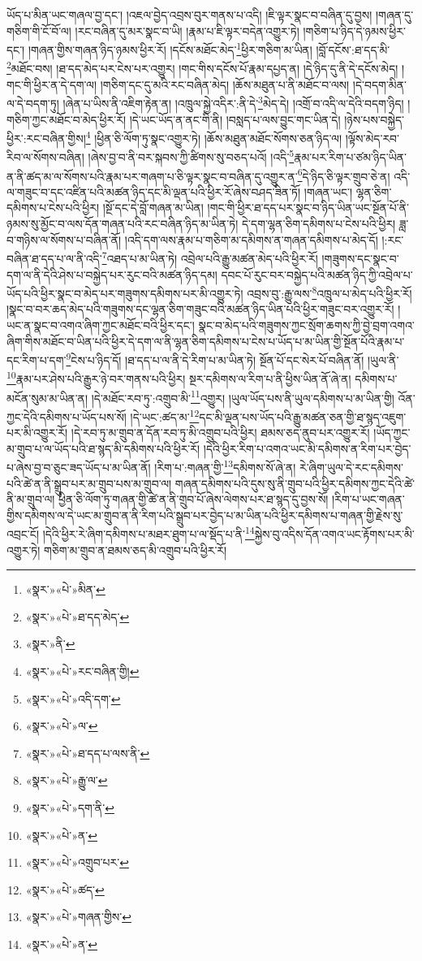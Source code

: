 ཡོད་པ་མིན་ཡང་གཞལ་བྱ་དང་། །འཇལ་བྱེད་འབྲས་བུར་གནས་པ་འདི། །ཇི་ལྟར་སྣང་བ་བཞིན་དུ་བྱས། །གཞན་དུ་གཅིག་གི་ངོ་བོ་ལ། །རང་བཞིན་དུ་མར་སྣང་བ་ཡི། །རྣམ་པ་ཇི་ལྟར་བདེན་འགྱུར་ཏེ། །གཅིག་པ་ཉིད་དེ་ཉམས་ཕྱིར་དང་། །གཞན་གྱིས་གཞན་ཉིད་ཉམས་ཕྱིར་རོ། །དངོས་མཐོང་མེད་\footnote{«སྣར་»«པེ་»མིན་}ཕྱིར་གཅིག་མ་ཡིན། །བློ་དངོས་:ཐ་དད་མི་\footnote{«སྣར་»«པེ་»ཐ་དད་མེད་}མཐོང་བས། །ཐ་དད་མེད་པར་ངེས་པར་འགྱུར། །གང་གིས་དངོས་པོ་རྣམ་དཔྱད་ན། །དེ་ཉིད་དུ་ནི་དེ་དངོས་མེད། །གང་གི་ཕྱིར་ན་དེ་དག་ལ། །གཅིག་དང་དུ་མའི་རང་བཞིན་མེད། །ཆོས་མཐུན་པ་ནི་མཐོང་བ་ལས། །དེ་བདག་མིན་ལ་དེ་བདག་ཏུ། །ཞེན་པ་ཡིས་ནི་འཇིག་རྟེན་ན། །འཁྲུལ་སྐྱེ་འདིར་:ནི་དེ་\footnote{«སྣར་»ནི་}མེད་དེ། །འགྲོ་བ་འདི་ལ་དེའི་བདག་ཉིད། །གཅིག་ཀྱང་མཐོང་བ་མེད་ཕྱིར་རོ། །དེ་ཡང་ཡོད་ན་ནང་གི་ནི། །བསླད་པ་ལས་བྱུང་གང་ཡིན་དེ། །ཉེས་པས་བསྐྱེད་ཕྱིར་:རང་བཞིན་གྱིས།\footnote{«སྣར་»«པེ་»རང་བཞིན་གྱི།} །ཕྱིན་ཅི་ལོག་ཏུ་སྣང་འགྱུར་ཏེ། །ཆོས་མཐུན་མཐོང་སོགས་ཅན་ཉིད་ལ། །ལྟོས་མེད་རབ་རིབ་ལ་སོགས་བཞིན། །ཞེས་བྱ་བ་ནི་བར་སྐབས་ཀྱི་ཚིགས་སུ་བཅད་པའོ། །འདི་\footnote{«སྣར་»«པེ་»འདི་དག་}རྣམ་པར་རིག་པ་ཙམ་ཉིད་ཡིན་ན་ནི་ཚད་མ་ལ་སོགས་པའི་རྣམ་པར་གཞག་པ་ཅི་ལྟར་སྣང་བ་བཞིན་དུ་འགྱུར་ན་\footnote{«སྣར་»«པེ་»ལ་}དེ་ཉིད་ཅི་ལྟར་གྲུབ་ཅེ་ན། འདི་ལ་གཟུང་བ་དང་འཛིན་པའི་མཚན་ཉིད་དང་མི་ལྡན་པའི་ཕྱིར་རོ་ཞེས་བཤད་ཟིན་ཏོ། །གཞན་ཡང་། ལྷན་ཅིག་དམིགས་པ་ངེས་པའི་ཕྱིར། །སྔོ་དང་དེ་བློ་གཞན་མ་ཡིན། །གང་གི་ཕྱིར་ཐ་དད་པར་སྣང་བ་ཉིད་ཡིན་ཡང་སྔོན་པོ་ནི་ཉམས་སུ་མྱོང་བ་ལས་དོན་གཞན་པའི་རང་བཞིན་ཉིད་མ་ཡིན་ཏེ། དེ་དག་ལྷན་ཅིག་དམིགས་པ་ངེས་པའི་ཕྱིར། ཟླ་བ་གཉིས་ལ་སོགས་པ་བཞིན་ནོ། །འདི་དག་ལས་རྣམ་པ་གཅིག་མ་དམིགས་ན་གཞན་དམིགས་པ་མེད་དོ། །:རང་བཞིན་ཐ་དད་པ་ལ་ནི་འདི་\footnote{«སྣར་»«པེ་»ཐ་དད་པ་ལས་ནི་}འཐད་པ་མ་ཡིན་ཏེ། འབྲེལ་པའི་རྒྱུ་མཚན་མེད་པའི་ཕྱིར་རོ། །གཟུགས་དང་སྣང་བ་དག་ལ་ནི་དེའི་ཤེས་པ་བསྐྱེད་པར་རུང་བའི་མཚན་ཉིད་དམ། དབང་པོ་རུང་བར་བསྐྱེད་པའི་མཚན་ཉིད་ཀྱི་འབྲེལ་པ་ཡོད་པའི་ཕྱིར་སྣང་བ་མེད་པར་གཟུགས་དམིགས་པར་མི་འགྱུར་ཏེ། འབྲས་བུ་:རྒྱུ་ལས་\footnote{«སྣར་»«པེ་»རྒྱུ་ལ་}འཁྲུལ་པ་མེད་པའི་ཕྱིར་རོ། །སྣང་བ་བར་ཆད་མེད་པའི་གཟུགས་དང་ལྷན་ཅིག་གཟུང་བའི་མཚན་ཉིད་ཡིན་པའི་ཕྱིར་གཟུང་བར་འགྱུར་རོ། །ཡང་ན་སྣང་བ་འགའ་ཞིག་ཀྱང་མཐོང་བའི་ཕྱིར་དང་། སྣང་བ་མེད་པའི་གཟུགས་ཀྱང་སྲོག་ཆགས་ཀྱི་བྱེ་བྲག་འགའ་ཞིག་གིས་མཐོང་བ་ཡིན་པའི་ཕྱིར་དེ་དག་ལ་ནི་ལྷན་ཅིག་དམིགས་པ་ངེས་པ་ཡོད་པ་མ་ཡིན་གྱི་སྔོན་པོའི་རྣམ་པ་དང་རིག་པ་དག་\footnote{«སྣར་»«པེ་»དག་ནི་}ངེས་པ་ཉིད་དོ། །ཐ་དད་པ་ལ་ནི་དེ་རིག་པ་མ་ཡིན་ཏེ། སྔོན་པོ་དང་སེར་པོ་བཞིན་ནོ། །ཡུལ་ནི་\footnote{«སྣར་»«པེ་»ན་}རྣམ་པར་ཤེས་པའི་རྒྱུར་ཉེ་བར་གནས་པའི་ཕྱིར། སྔར་དམིགས་ལ་རིག་པ་ནི་ཕྱིས་ཡིན་ནོ་ཞེ་ན། དམིགས་པ་མངོན་སུམ་མ་ཡིན་ན། །དེ་མཐོང་རབ་ཏུ་:འགྲུབ་མི་\footnote{«སྣར་»«པེ་»འགྲུབ་པར་}འགྱུར། །ཡུལ་ཡོད་པས་ནི་ཡུལ་དམིགས་པ་མ་ཡིན་གྱི། འོན་ཀྱང་དེའི་དམིགས་པ་ཡོད་པས་སོ། །དེ་ཡང་:ཚད་མ་\footnote{«སྣར་»«པེ་»ཚད་}དང་མི་ལྡན་པས་ཡོད་པའི་རྒྱུ་མཚན་ཅན་གྱི་ཐ་སྙད་འཇུག་པར་མི་འགྱུར་རོ། །དེ་རབ་ཏུ་མ་གྲུབ་ན་དོན་རབ་ཏུ་མི་འགྲུབ་པའི་ཕྱིར། ཐམས་ཅད་ནུབ་པར་འགྱུར་རོ། །ཡོད་ཀྱང་མ་གྲུབ་པ་ལ་ཡོད་པའི་ཐ་སྙད་མི་དམིགས་པའི་ཕྱིར་རོ། །དེའི་ཕྱིར་རིག་པ་འགའ་ཡང་མི་དམིགས་ན་རིག་པར་བྱེད་པ་ཞེས་བྱ་བ་ཅུང་ཟད་ཡོད་པ་མ་ཡིན་ནོ། །རིག་པ་:གཞན་གྱི་\footnote{«སྣར་»«པེ་»གཞན་གྱིས་}དམིགས་སོ་ཞེ་ན། རེ་ཞིག་ཡུལ་དེ་རང་དམིགས་པའི་ཚེ་ན་ནི་སྒྲུབ་པར་མ་གྲུབ་པས་མ་གྲུབ་ལ། གཞན་དམིགས་པའི་དུས་སུ་ནི་གྲུབ་པའི་ཕྱིར་དམིགས་ཀྱང་དེའི་ཚེ་ནི་མ་གྲུབ་ལ། ཕྱིན་ཅི་ལོག་ཏུ་གཞན་གྱི་ཚེ་ན་ནི་གྲུབ་པོ་ཞེས་ལེགས་པར་ཐ་སྙད་དུ་བྱས་སོ། །རིག་པ་ཡང་གཞན་གྱིས་དམིགས་ལ་དེ་ཡང་མ་གྲུབ་ན་ནི་རིག་པའི་སྒྲུབ་པར་བྱེད་པ་མ་ཡིན་པའི་ཕྱིར་དམིགས་པ་གཞན་གྱི་རྗེས་སུ་འབྲང་ངོ། །དེའི་ཕྱིར་རེ་ཞིག་དམིགས་པ་མཐར་ཐུག་པ་ལ་སྡོད་པ་ནི་\footnote{«སྣར་»«པེ་»ན་}སྐྱེས་བུ་འདིས་དོན་འགའ་ཡང་རྟོགས་པར་མི་འགྱུར་ཏེ། གཅིག་མ་གྲུབ་ན་ཐམས་ཅད་མི་འགྲུབ་པའི་ཕྱིར་རོ། 
